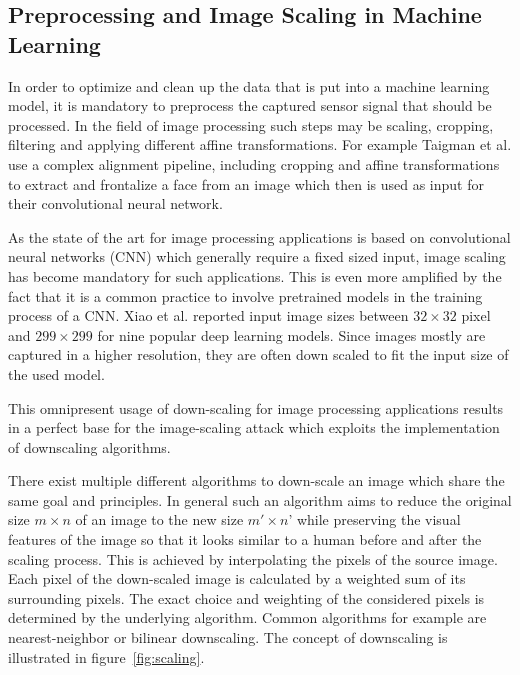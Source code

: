 \documentclass[sigconf]{acmart}
\begin{document}
\subsection{Preprocessing and Image Scaling in Machine Learning}
\label{sec:prepimgscale}
In order to optimize and clean up the data that is put into a machine learning model, it is mandatory to preprocess the captured sensor signal that should be processed.
In the field of image processing such steps may be scaling, cropping, filtering and applying different affine transformations.
For example Taigman et al.\cite{6909616} use a complex alignment pipeline, including cropping and affine transformations to extract and frontalize a face from an image which then is used as input for their convolutional neural network. 

As the state of the art for image processing applications is based on convolutional neural networks (CNN) which generally require a fixed sized input, image scaling has become mandatory for such applications.
This is even more amplified by the fact that it is a common practice to involve pretrained models in the training process of a CNN.
Xiao et al.\cite{camouflage} reported input image sizes between $32 \times 32$ pixel and $299 \times 299$ for nine popular deep learning models.
Since images mostly are captured in a higher resolution, they are often down scaled to fit the input size of the used model.

This omnipresent usage of down-scaling for image processing applications results in a perfect base for the image-scaling attack which exploits the implementation of downscaling algorithms.

There exist multiple different algorithms to down-scale an image which share the same goal and principles.
In general such an algorithm aims to reduce the original size $m \times n$ of an image to the new size $m' \times n$' while preserving the visual features of the image so that it looks similar to a human before and after the scaling process.
This is achieved by interpolating the pixels of the source image.
Each pixel of the down-scaled image is calculated by a weighted sum of its surrounding pixels.
The exact choice and weighting of the considered pixels is determined by the underlying algorithm.
Common algorithms for example are nearest-neighbor or bilinear downscaling.
The concept of downscaling is illustrated in figure~\ref{fig:scaling}.
\end{document}
